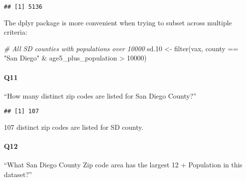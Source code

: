 \documentclass[
]{article}
\newenvironment{Shaded}{\begin{snugshade}}{\end{snugshade}}
\newcommand{\CommentTok}[1]{\textcolor[rgb]{0.56,0.35,0.01}{\textit{#1}}}
\newcommand{\DecValTok}[1]{\textcolor[rgb]{0.00,0.00,0.81}{#1}}
\newcommand{\FloatTok}[1]{\textcolor[rgb]{0.00,0.00,0.81}{#1}}
\newcommand{\FunctionTok}[1]{\textcolor[rgb]{0.00,0.00,0.00}{#1}}
\newcommand{\NormalTok}[1]{#1}
\newcommand{\OtherTok}[1]{\textcolor[rgb]{0.56,0.35,0.01}{#1}}
\newcommand{\SpecialCharTok}[1]{\textcolor[rgb]{0.00,0.00,0.00}{#1}}
\newcommand{\StringTok}[1]{\textcolor[rgb]{0.31,0.60,0.02}{#1}}
\begin{document}
\begin{verbatim}
## [1] 5136
\end{verbatim}

The dplyr package is more convenient when trying to subset across
multiple criteria:

\begin{Shaded}
\begin{Highlighting}[]
\CommentTok{\# All SD counties with populations over 10000}
\NormalTok{sd}\FloatTok{.10} \OtherTok{\textless{}{-}} \FunctionTok{filter}\NormalTok{(vax, county }\SpecialCharTok{==} \StringTok{"San Diego"} \SpecialCharTok{\&}
\NormalTok{                age5\_plus\_population }\SpecialCharTok{\textgreater{}} \DecValTok{10000}\NormalTok{)}
\end{Highlighting}
\end{Shaded}

\hypertarget{q11}{%
\paragraph{Q11}\label{q11}}

``How many distinct zip codes are listed for San Diego County?''

\begin{Shaded}
\end{Shaded}

\begin{verbatim}
## [1] 107
\end{verbatim}

107 distinct zip codes are listed for SD county.

\hypertarget{q12}{%
\paragraph{Q12}\label{q12}}

``What San Diego County Zip code area has the largest 12 + Population in
this dataset?''

\begin{Shaded}
\end{Shaded}
\end{document}

